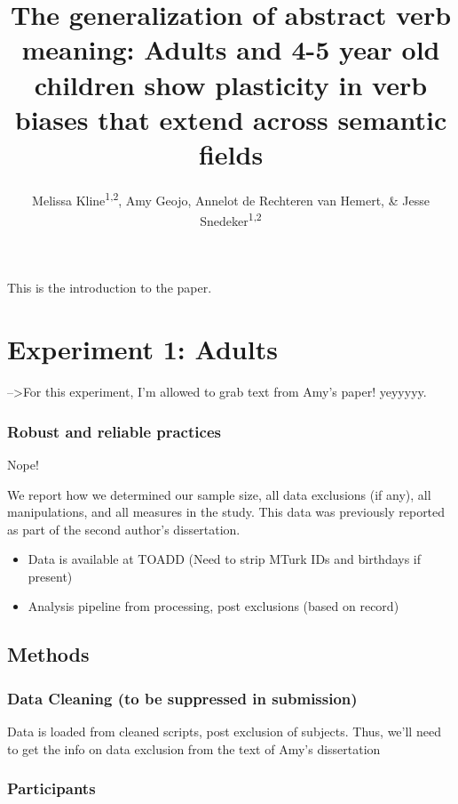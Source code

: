 \documentclass[english,man]{apa6}
\title{The generalization of abstract verb meaning: Adults and 4-5 year old
children show plasticity in verb biases that extend across semantic
fields}
\author{Melissa Kline\textsuperscript{1,2}, Amy Geojo, Annelot de Rechteren van Hemert, \& Jesse Snedeker\textsuperscript{1,2}}
\affiliation{
    \vspace{0.5cm}
          \textsuperscript{1} Massachusetts Institute of Technology\\
          \textsuperscript{2} Harvard University\\
          \textsuperscript{3} TODO: Annelot's current institution  }
\providecommand{\tightlist}{%
  \setlength{\itemsep}{0pt}\setlength{\parskip}{0pt}}
\newcounter{author}
\theoremstyle{definition}
\theoremstyle{definition}
\theoremstyle{remark}
\begin{document}
\maketitle

\setcounter{secnumdepth}{0}



This is the introduction to the paper.

\section{Experiment 1: Adults}\label{experiment-1-adults}

--\textgreater{}For this experiment, I'm allowed to grab text from Amy's
paper! yeyyyyy.

\subsubsection{Robust and reliable
practices}\label{robust-and-reliable-practices}

Nope!

We report how we determined our sample size, all data exclusions (if
any), all manipulations, and all measures in the study. This data was
previously reported as part of the second author's dissertation.

\begin{itemize}
\tightlist
\item
  Data is available at TOADD (Need to strip MTurk IDs and birthdays if
  present)
\item
  Analysis pipeline from processing, post exclusions (based on record)
\end{itemize}

\subsection{Methods}\label{methods}

\subsubsection{Data Cleaning (to be suppressed in
submission)}\label{data-cleaning-to-be-suppressed-in-submission}

Data is loaded from cleaned scripts, post exclusion of subjects. Thus,
we'll need to get the info on data exclusion from the text of Amy's
dissertation

\subsubsection{Participants}\label{participants}
\end{document}
